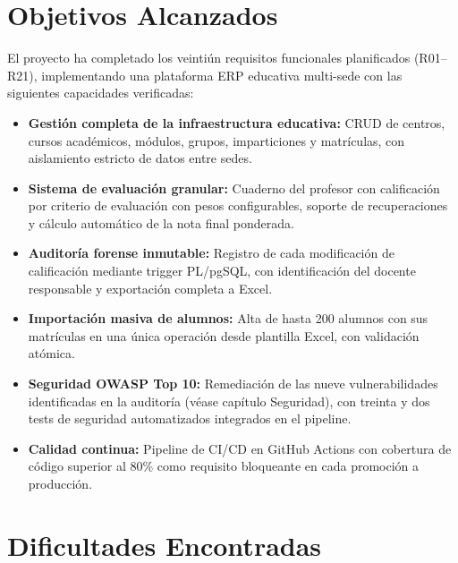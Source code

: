\documentclass[12pt, a4paper]{report}
\begin{document}
\section{Objetivos Alcanzados}

El proyecto ha completado los veintiún requisitos funcionales planificados
(R01--R21), implementando una plataforma ERP educativa multi-sede con las
siguientes capacidades verificadas:

\begin{itemize}
  \item \textbf{Gestión completa de la infraestructura educativa:} CRUD de centros,
        cursos académicos, módulos, grupos, imparticiones y matrículas, con
        aislamiento estricto de datos entre sedes.
  \item \textbf{Sistema de evaluación granular:} Cuaderno del profesor con
        calificación por criterio de evaluación con pesos configurables,
        soporte de recuperaciones y cálculo automático de la nota final ponderada.
  \item \textbf{Auditoría forense inmutable:} Registro de cada modificación de
        calificación mediante trigger PL/pgSQL, con identificación del docente
        responsable y exportación completa a Excel.
  \item \textbf{Importación masiva de alumnos:} Alta de hasta 200 alumnos con sus
        matrículas en una única operación desde plantilla Excel, con validación
        atómica.
  \item \textbf{Seguridad OWASP Top 10:} Remediación de las nueve vulnerabilidades
        identificadas en la auditoría (véase capítulo Seguridad), con
        treinta y dos tests de seguridad automatizados integrados en el pipeline.
  \item \textbf{Calidad continua:} Pipeline de CI/CD en GitHub Actions con
        cobertura de código superior al 80\% como requisito bloqueante en cada
        promoción a producción.
\end{itemize}

\section{Dificultades Encontradas}
\end{document}
